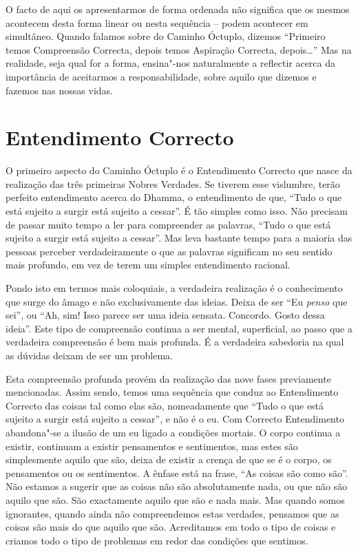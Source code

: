 \bigskip

O facto de aqui os apresentarmos de forma ordenada não significa que os mesmos
acontecem desta forma linear ou nesta sequência – podem acontecer em simultâneo.
Quando falamos sobre do Caminho Óctuplo, dizemos “Primeiro temos Compreensão
Correcta, depois temos Aspiração Correcta, depois\ldots{}” Mas na realidade, seja
qual for a forma, ensina"-nos naturalmente a reflectir acerca da importância de
aceitarmos a responsabilidade, sobre aquilo que dizemos e fazemos nas nossas
vidas.

\clearpage

\section{Entendimento Correcto}

O primeiro aspecto do Caminho Óctuplo é o Entendimento Correcto que nasce da
realização das três primeiras Nobres Verdades. Se tiverem esse vislumbre, terão
perfeito entendimento acerca do Dhamma, o entendimento de que, “Tudo o que está
sujeito a surgir está sujeito a cessar”. É tão simples como isso. Não precisam
de passar muito tempo a ler para compreender as palavras, “Tudo o que está
sujeito a surgir está sujeito a cessar”. Mas leva bastante tempo para a maioria
das pessoas perceber verdadeiramente o que as palavras significam no seu sentido
mais profundo, em vez de terem um simples entendimento racional.

Pondo isto em termos mais coloquiais, a verdadeira realização é o conhecimento
que surge do âmago e não exclusivamente das ideias. Deixa de ser “Eu
\emph{penso} que sei”, ou “Ah, sim! Isso parece ser uma ideia sensata. Concordo.
Gosto dessa ideia”. Este tipo de compreensão continua a ser mental,
superficial, ao passo que a verdadeira compreensão é bem mais profunda. É a
verdadeira sabedoria na qual as dúvidas deixam de ser um problema.

Esta compreensão profunda provém da realização das nove fases previamente
mencionadas. Assim sendo, temos uma sequência que conduz ao Entendimento
Correcto das coisas tal como elas são, nomeadamente que “Tudo o que está sujeito
a surgir está sujeito a cessar”, e não é o eu. Com Correcto Entendimento
abandona"-se a ilusão de um eu ligado a condições mortais. O corpo continua a
existir, continuam a existir pensamentos e sentimentos, mas estes são
simplesmente aquilo que são, deixa de existir a crença de que se é o corpo, os
pensamentos ou os sentimentos. A ênfase está na frase, “As coisas são como são”.
Não estamos a sugerir que as coisas não são absolutamente nada, ou que não são
aquilo que são. São exactamente aquilo que são e nada mais. Mas quando somos
ignorantes, quando ainda não compreendemos estas verdades, pensamos que as
coisas são mais do que aquilo que são. Acreditamos em todo o tipo de coisas e
criamos todo o tipo de problemas em redor das condições que sentimos.

